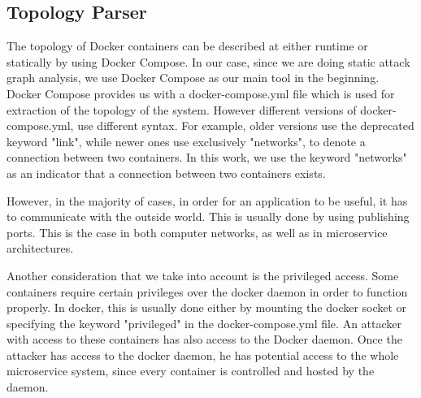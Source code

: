 \subsection{Topology Parser}
\label{chap:topology_p}

The topology of Docker containers can be described at either runtime or statically by using Docker Compose. In our case, since we are doing static attack graph analysis, we use Docker Compose as our main tool in the beginning. Docker Compose provides us with a docker-compose.yml file which is used for extraction of the topology of the system. However different versions of docker-compose.yml, use different syntax. For example, older versions use the deprecated keyword "link", while newer ones use exclusively "networks", to denote a connection between two containers. In this work, we use the keyword "networks" as an indicator that a connection between two containers exists.

However, in the majority of cases, in order for an application to be useful, it has to communicate with the outside world. This is usually done by using publishing ports. This is the case in both computer networks, as well as in microservice architectures.

Another consideration that we take into account is the privileged access. Some containers require certain privileges over the docker daemon in order to function properly. In docker, this is usually done either by mounting the docker socket or specifying the keyword "privileged" in the docker-compose.yml file. An attacker with access to these containers has also access to the Docker daemon. Once the attacker has access to the docker daemon, he has potential access to the whole microservice system, since every container is controlled and hosted by the daemon.

